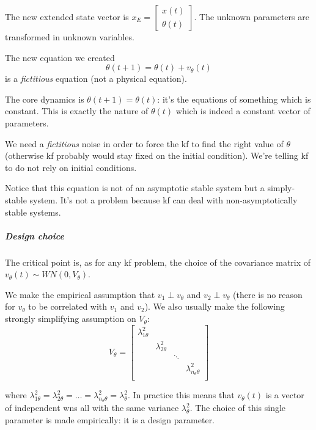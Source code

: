 The new extended state vector is $x_E = \begin{bmatrix} x(t) \\ \theta(t) \end{bmatrix}$.
The unknown parameters are transformed in unknown variables.

\begin{rem}
    The new equation we created
    \[
        \theta(t+1) = \theta(t) + v_\theta(t)
    \]
    is a \emph{fictitious} equation (not a physical equation).

    The core dynamics is $\theta(t+1)=\theta(t)$: it's the equations of something which is constant.
    This is exactly the nature of $\theta(t)$ which is indeed a constant vector of parameters.

    We need a \emph{fictitious} noise in order to force the \acrlong{kf} to find the right value of $\theta$ (otherwise \gls{kf} probably would stay fixed on the initial condition).
    We're telling \gls{kf} to do not rely on initial conditions.

    Notice that this equation is not of an asymptotic stable system but a simply-stable system.
    It's not a problem because \gls{kf} can deal with non-asymptotically stable systems.
\end{rem}

\subparagraph{Design choice} The critical point is, as for any \gls{kf} problem, the choice of the covariance matrix of $v_\theta(t) \sim WN(0, V_\theta)$. 

We make the empirical assumption that $v_1 \perp v_\theta$ and $v_2 \perp v_\theta$ (there is no reason for $v_\theta$ to be correlated with $v_1$ and $v_2$).
We also usually make the following strongly simplifying assumption on $V_\theta$: 
\[
    V_\theta = \begin{bmatrix}
        \lambda_{1\theta}^2 & & & \\
        & \lambda_{2\theta}^2 & & \\
        & & \ddots & \\
        & & & \lambda_{n_\theta\theta}^2\\
    \end{bmatrix}
\]

where $\lambda_{1\theta}^2=\lambda_{2\theta}^2=\dots=\lambda_{n_\theta\theta}^2 = \lambda_{\theta}^2$.
In practice this means that $v_\theta(t)$ is a vector of independent \gls{wn}s all with the same variance $\lambda_\theta^2$.
The choice of this single parameter is made empirically: it is a design parameter. 

